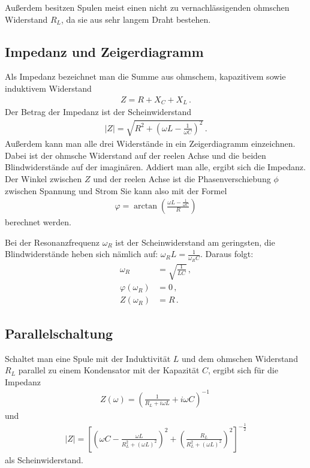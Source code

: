 \documentclass[12pt,a4paper,titlepage,headinclude,bibtotoc]{scrartcl}
\begin{document}
Außerdem besitzen Spulen meist einen nicht zu vernachlässigenden ohmschen Widerstand $R_L$, da sie aus sehr langem Draht bestehen.

\subsection{Impedanz und Zeigerdiagramm}
Als Impedanz bezeichnet man die Summe aus ohmschem, kapazitivem sowie induktivem Widerstand
\begin{align}
	Z=R+X_C+X_L \,.
\end{align}
Der Betrag der Impedanz ist der Scheinwiderstand
\begin{align}
	|Z|=\sqrt{R^2+\left(\omega L - \frac{1}{\omega C}\right)^2} \,.
	\label{eq:Scheinwiderstand_serie}
\end{align}
Außerdem kann man alle drei Widerstände in ein Zeigerdiagramm einzeichnen.
Dabei ist der ohmsche Widerstand auf der reelen Achse und die beiden Blindwiderstände auf der imaginären.
Addiert man alle, ergibt sich die Impedanz.
Der Winkel zwischen $Z$ und der reelen Achse ist die Phasenverschiebung $\phi$ zwischen Spannung und Strom 
Sie kann also mit der Formel 
\begin{align}
	\varphi=\arctan\left(\frac{\omega L - \frac{1}{\omega C}}{R} \right)
	\label{eq:phase_serie}
\end{align}
berechnet werden.

Bei der Resonanzfrequenz $\omega_R$ ist der Scheinwiderstand am geringsten, die Blindwiderstände heben sich nämlich auf: $\omega_R L=\frac{1}{\omega_R C}$.
Daraus folgt:
\begin{align}
	\omega_R&=\sqrt{\frac{1}{LC}}
	\label{eq:omega_R}	
	\,,\\
	\varphi(\omega_R)&=0\,,\\
	Z(\omega_R)&=R\,.
\end{align}

\subsection{Parallelschaltung}
Schaltet man eine Spule mit der Induktivität $L$ und dem ohmschen Widerstand $R_L$ parallel zu einem Kondensator mit der Kapazität $C$, ergibt sich für die Impedanz
\begin{align}
	Z(\omega)=\left(\frac{1}{R_L+i\omega L}+i\omega C\right)^{-1}\
\end{align}
und
\begin{align}
	|Z|=\left[\left(\omega C - \frac{\omega L}{R_L^2+(\omega L)^2}\right)^2+	\left(\frac{R_L}{R_L^2+(\omega L)^2}\right)^2\right]^{-\frac{1}{2}}
	\label{eq:parallel}
\end{align}
als Scheinwiderstand.
                                                                                                                                                                      
\end{document}
